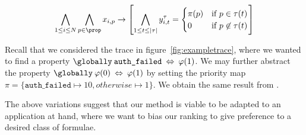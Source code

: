 \begin{align}
    \bigwedge _{1 \leq i \leq N} \bigwedge _{p \in \prop} x_{i, p} \rightarrow \left[ 
        \bigwedge _{1 \leq t \leq |\tau|} y^\tau _{i, t} = \begin{cases}
            \pi(p) & \textnormal{if } p \in \tau (t) \\
            0 & \textnormal{if } p \not \in \tau (t)
        \end{cases}
    \right] \label{eq:prop_priority_score} 
\end{align}

Recall that we considered the trace in figure~\ref{fig:exampletrace}, where we
wanted to find a property $\globally \:\texttt{auth\_failed}\: \Leftrightarrow\:
\varphi(1)$. We may further abstract the property $\globally \: \varphi(0) \:
\Leftrightarrow\: \varphi(1)$ by setting the priority map $\pi =
\{\texttt{auth\_failed} \mapsto 10, otherwise \mapsto 1\}$. We obtain the same
result from \ourtool.


The above variations suggest that our method is viable to be adapted  to an
application at hand, where we want to bias our ranking to give preference to a
desired class of formulae.



